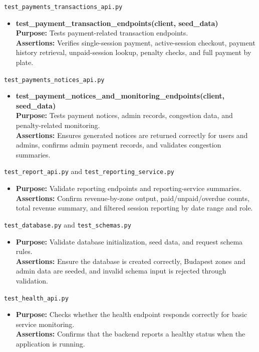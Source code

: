 \documentclass[12pt,a4paper,oneside]{report}
\begin{document}
\texttt{test\_payments\_transactions\_api.py}
\begin{itemize}[leftmargin=2em]
    \item \textbf{test\_payment\_transaction\_endpoints(client, seed\_data)} \\
    \textbf{Purpose:} Tests payment-related transaction endpoints. \\
    \textbf{Assertions:} Verifies single-session payment, active-session checkout, payment history retrieval, unpaid-session lookup, penalty checks, and full payment by plate.
\end{itemize}

\texttt{test\_payments\_notices\_api.py}
\begin{itemize}[leftmargin=2em]
    \item \textbf{test\_payment\_notices\_and\_monitoring\_endpoints(client, seed\_data)} \\
    \textbf{Purpose:} Tests payment notices, admin records, congestion data, and penalty-related monitoring. \\
    \textbf{Assertions:} Ensures generated notices are returned correctly for users and admins, confirms admin payment records, and validates congestion summaries.
\end{itemize}

\texttt{test\_report\_api.py} and \texttt{test\_reporting\_service.py}
\begin{itemize}[leftmargin=2em]
    \item \textbf{Purpose:} Validate reporting endpoints and reporting-service summaries. \\
    \textbf{Assertions:} Confirm revenue-by-zone output, paid/unpaid/overdue counts, total revenue summary, and filtered session reporting by date range and role.
\end{itemize}

\texttt{test\_database.py} and \texttt{test\_schemas.py}
\begin{itemize}[leftmargin=2em]
    \item \textbf{Purpose:} Validate database initialization, seed data, and request schema rules. \\
    \textbf{Assertions:} Ensure the database is created correctly, Budapest zones and admin data are seeded, and invalid schema input is rejected through validation.
\end{itemize}

\texttt{test\_health\_api.py}
\begin{itemize}[leftmargin=2em]
    \item \textbf{Purpose:} Checks whether the health endpoint responds correctly for basic service monitoring. \\
    \textbf{Assertions:} Confirms that the backend reports a healthy status when the application is running.
\end{itemize}
\end{document}
